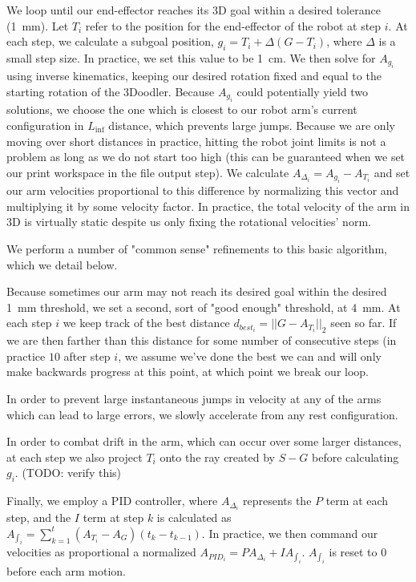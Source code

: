 \documentclass[conference]{acmsiggraph}
\begin{document}
We loop until our end-effector reaches its 3D goal within a desired tolerance (1~mm).  Let $T_i$ refer to the position for the end-effector of the robot at step $i$.  At each step, we calculate a subgoal position, $g_i = T_i + \Delta(G - T_i)$, where $\Delta$ is a small step size.  In practice, we set this value to be 1~cm.  We then solve for $A_{g_i}$ using inverse kinematics, keeping our desired rotation fixed and equal to the starting rotation of the 3Doodler.  Because $A_{g_i}$ could potentially yield two solutions, we choose the one which is closest to our robot arm's current configuration in $L_{\inf}$ distance, which prevents large jumps.  Because we are only moving over short distances in practice, hitting the robot joint limits is not a problem as long as we do not start too high (this can be guaranteed when we set our print workspace in the file output step).  We calculate $A_{\Delta_i} = A_{g_i} - A_{T_i}$ and set our arm velocities proportional to this difference by normalizing this vector and multiplying it by some velocity factor.  In practice, the total velocity of the arm in 3D is virtually static despite us only fixing the rotational velocities' norm.

We perform a number of "common sense" refinements to this basic algorithm, which we detail below.

Because sometimes our arm may not reach its desired goal within the desired 1~mm threshold, we set a second, sort of "good enough" threshold, at 4~mm.  At each step $i$ we keep track of the best distance $d_{{best}_i} = ||G - A_{T_i}||_2$ seen so far.  If we are then farther than this distance for some number of consecutive steps (in practice $10$ after step $i$, we assume we've done the best we can and will only make backwards progress at this point, at which point we break our loop.

In order to prevent large instantaneous jumps in velocity at any of the arms which can lead to large errors, we slowly accelerate from any rest configuration.

In order to combat drift in the arm, which can occur over some larger distances, at each step we also project $T_{i}$ onto the ray created by $S - G$ before calculating $g_i$. (TODO: verify this)

Finally, we employ a PID controller, where $A_{\Delta_i}$ represents the $P$ term at each step, and the $I$ term at step $k$ is calculated as $A_{\int_i} = \sum_{k=1}^{t} (A_{T_i} - A_G)(t_k - t_{k-1})$.  In practice, we then command our velocities as proportional a normalized $A_{{PID}_i} = PA_{\Delta_i} + IA_{\int_i}$.  $A_{\int_i}$ is reset to $0$ before each arm motion.
\end{document}

